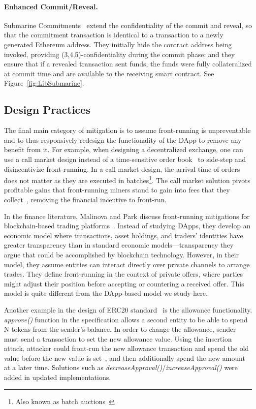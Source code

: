 \paragraph{Enhanced Commit/Reveal.} Submarine Commitments~\cite{libsubmarine,submarinesendHD} extend the confidentiality of the commit and reveal, so that the commitment transaction is identical to a transaction to a newly generated Ethereum address. They initially hide the contract address being invoked, providing (3,4,5)-confidentiality during the commit phase; and they ensure that if a revealed transaction sent funds, the funds were fully collateralized at commit time and are available to the receiving smart contract. See Figure~\ref{fig:LibSubmarine}.

\subsection{Design Practices}

The final main category of mitigation is to assume front-running is unpreventable and to thus responsively redesign the functionality of the DApp to remove any benefit from it. For example, when designing a decentralized exchange, one can use a call market design instead of a time-sensitive order book~\cite{clark2014decentralizing} to side-step and disincentivize front-running. In a call market design, the arrival time of orders does not matter as they are executed in batches\footnote{Also known as batch auctions~\cite{batchAuctions18}}. The call market solution pivots profitable gains that front-running miners stand to gain into fees that they collect~\cite{clark2014decentralizing}, removing the financial incentive to front-run.

In the finance literature, Malinova and Park discuss front-running mitigations for blockchain-based trading platforms~\cite{malinova2017market}. Instead of studying DApps, they develop an economic model where transactions, asset holdings, and traders' identities have greater transparency than in standard economic models---transparency they argue that could be accomplished by blockchain technology. However, in their model, they assume entities can interact directly over private channels to arrange trades. They define front-running in the context of private offers, where parties might adjust their position before accepting or countering a received offer. This model is quite different from the DApp-based model we study here. 

Another example in the design of ERC20 standard~\cite{erc20} is the allowance functionality. \textit{approve()} function in the specification allows a second entity to be able to spend N tokens from the sender's balance. In order to change the allowance, sender must send a transaction to set the new allowance value. Using the insertion attack, attacker could front-run the new allowance transaction and spend the old value before the new value is set~\cite{blockchainProjectAllowanceAttack,erc20GithubIssue}, and then additionally spend the new amount at a later time. Solutions such as \textit{decreaseApproval()}/\textit{increaseApproval()} were added in updated implementations.

